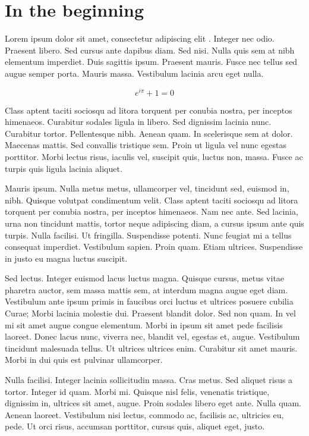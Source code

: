 \chapter{In the beginning}

Lorem ipsum dolor sit amet, consectetur adipiscing elit
\citep{Eigen1971}. Integer nec odio. Praesent libero. Sed cursus ante
dapibus diam. Sed nisi. Nulla quis sem at nibh elementum imperdiet. Duis
sagittis ipsum. Praesent mauris. Fusce nec tellus sed augue semper
porta. Mauris massa. Vestibulum lacinia arcu eget nulla.

\[e^{i\pi} + 1 = 0\]

Class aptent taciti sociosqu ad litora torquent per conubia nostra, per
inceptos himenaeos. Curabitur sodales ligula in libero. Sed dignissim
lacinia nunc. Curabitur tortor. Pellentesque nibh. Aenean quam. In
scelerisque sem at dolor. Maecenas mattis. Sed convallis tristique sem.
Proin ut ligula vel nunc egestas porttitor. Morbi lectus risus, iaculis
vel, suscipit quis, luctus non, massa. Fusce ac turpis quis ligula
lacinia aliquet.

Mauris ipsum. Nulla metus metus, ullamcorper vel, tincidunt sed, euismod
in, nibh. Quisque volutpat condimentum velit. Class aptent taciti
sociosqu ad litora torquent per conubia nostra, per inceptos himenaeos.
Nam nec ante. Sed lacinia, urna non tincidunt mattis, tortor neque
adipiscing diam, a cursus ipsum ante quis turpis. Nulla facilisi. Ut
fringilla. Suspendisse potenti. Nunc feugiat mi a tellus consequat
imperdiet. Vestibulum sapien. Proin quam. Etiam ultrices. Suspendisse in
justo eu magna luctus suscipit.

Sed lectus. Integer euismod lacus luctus magna. Quisque cursus, metus
vitae pharetra auctor, sem massa mattis sem, at interdum magna augue
eget diam. Vestibulum ante ipsum primis in faucibus orci luctus et
ultrices posuere cubilia Curae; Morbi lacinia molestie dui. Praesent
blandit dolor. Sed non quam. In vel mi sit amet augue congue elementum.
Morbi in ipsum sit amet pede facilisis laoreet. Donec lacus nunc,
viverra nec, blandit vel, egestas et, augue. Vestibulum tincidunt
malesuada tellus. Ut ultrices ultrices enim. Curabitur sit amet mauris.
Morbi in dui quis est pulvinar ullamcorper.

Nulla facilisi. Integer lacinia sollicitudin massa. Cras metus. Sed
aliquet risus a tortor. Integer id quam. Morbi mi. Quisque nisl felis,
venenatis tristique, dignissim in, ultrices sit amet, augue. Proin
sodales libero eget ante. Nulla quam. Aenean laoreet. Vestibulum nisi
lectus, commodo ac, facilisis ac, ultricies eu, pede. Ut orci risus,
accumsan porttitor, cursus quis, aliquet eget, justo.

